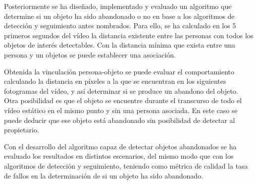 Posteriormente se ha diseñado, implementado y evaluado un algoritmo que determine si un objeto ha sido abandonado o no en base a los algoritmos de detección y seguimiento antes nombrados. Para ello, se ha calculado en los 5 primeros segundos del vídeo la distancia existente entre las personas con todos los objetos de interés detectables. Con la distancia mínima que exista entre una persona y un objetos se puede establecer una asociación.

Obtenida la vinculación persona-objeto se puede evaluar el comportamiento calculando la distancia en píxeles a la que se encuentran en los siguientes fotogramas del vídeo, y así determinar si se produce un abandono del objeto. Otra posibilidad es que el objeto se encuentre durante el transcurso de todo el vídeo estático \cite{luna2018} en el mismo punto y sin una persona asociada. En este caso se puede deducir que ese objeto está abandonado sin posibilidad de detectar al propietario.

Con el desarrollo del algoritmo capaz de detectar objetos abandonados se ha evaluado los resultados en distintos escenarios, del mismo modo que con los algoritmos de detección y seguimiento, teniendo como métrica de calidad la tasa de fallos en la determinación de si un objeto ha sido abandonado.
